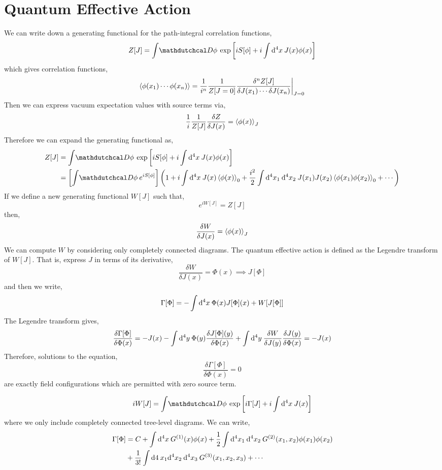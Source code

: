\documentclass[12pt]{extarticle}
\begin{document}
\section{Quantum Effective Action}

We can write down a generating functional for the path-integral correlation functions,
\[ Z[J] = \int \pathd{\phi} \exp{\left[ i S[\phi] + i \int \dn{4}{x} J(x) \phi(x) \right]} \]
which gives correlation functions,
\[ \left< \phi(x_1) \cdots \phi(x_n) \right> = \frac{1}{i^n} \frac{1}{Z[J = 0]} \frac{\delta^n Z[J]}{\delta J(x_1) \cdots \delta J(x_n)} \bigg|_{J = 0} \]
Then we can express vacuum expectation values with source terms via,
\[ \frac{1}{i} \frac{1}{Z[J]} \frac{\delta Z}{\delta J(x)} = \left< \phi(x) \right>_J \]
Therefore we can expand the generating functional as,
\begin{align*}
Z[J] & = \int \pathd{\phi} \exp{\left[ i S[\phi] + i \int \dn{4}{x} J(x) \phi(x) \right]} 
\\
& = \left[ \int \pathd{\phi} e^{i S[\phi]} \right] \left( 1 + i \int \dn{4}{x} J(x) \EV{\phi(x)}_0 + \frac{i^2}{2} \int \dn{4}{x_1} \dn{4}{x_2} J(x_1) J(x_2) \EV{\phi(x_1) \phi(x_2)}_0 + \cdots \right)
\end{align*}
If we define a new generating functional $W[J]$ such that,
\[ e^{i W[J]} = Z[J] \]
then,
\[ \frac{\delta W}{\delta J(x)} = \left< \phi(x) \right>_J \]
We can compute $W$ by considering only completely connected diagrams. The quantum effective action is defined as the Legendre transform of $W[J]$. That is, express $J$ in terms of its derivative,
\[ \frac{\delta W}{\delta J(x)} = \Phi(x) \implies J[\Phi] \]
and then we write,
\[ \Gamma[\Phi] = - \int \mathrm{d}^{4} x \: \Phi(x) J[\Phi](x) + W[J[\Phi]] \]
The Legendre transform gives,
\[ \frac{\delta \Gamma[\Phi]}{\delta \Phi(x)} = - J(x) - \int \mathrm{d}^{4} y \: \Phi(y) \frac{\delta J[\Phi](y)}{\delta \Phi(x)} + \int \mathrm{d}^{4} y \: \frac{\delta W}{\delta J(y)} \frac{\delta J(y)}{\delta \Phi(x)}  = - J(x) \]
Therefore, solutions to the equation,
\[ \frac{\delta \Gamma[\Phi]}{\delta \Phi(x)} = 0 \]
are exactly field configurations which are permitted with zero source term.

\begin{theorem}
\[ i W[J] = \int \pathd{\phi} \exp{\left[ i \Gamma[J] + i \int  \dn{4}{x} J(x) \right]} \]
where we only include completely connected tree-level diagrams. We can write,
\begin{align*}
\Gamma[\Phi] & = C + \int \mathrm{d}^{4} x \: G^{(1)}(x) \phi(x) + \frac{1}{2} \int \mathrm{d}^{4} x_1 \: \mathrm{d}^{4} x_2 \: G^{(2)}(x_1, x_2) \phi(x_1) \phi(x_2) 
\\
\quad \quad & + \frac{1}{3!} \int \mathrm{d}4 \:{x_1} \mathrm{d}^{4} x_2 \: \mathrm{d}^{4} x_3 \: G^{(3)}(x_1, x_2, x_3) + \cdots 
\end{align*}
\end{theorem}
\end{document}
